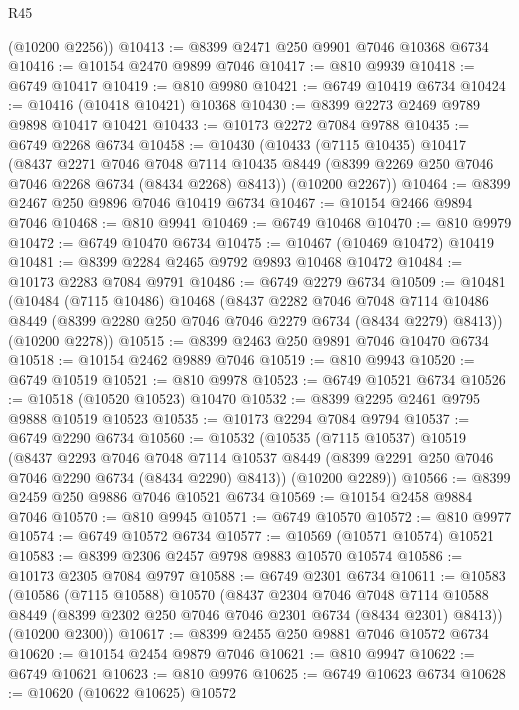 \begin{lexlean}{R45}
\begin{coremodule}
{      (@10200 @2256))
@10413 := @8399 @2471 @250 @9901 @7046 @10368 @6734
@10416 := @10154 @2470 @9899 @7046
@10417 := @810 @9939
@10418 := @6749 @10417
@10419 := @810 @9980
@10421 := @6749 @10419 @6734
@10424 := @10416 (@10418 @10421) @10368
@10430 := @8399 @2273 @2469 @9789 @9898 @10417 @10421
@10433 := @10173 @2272 @7084 @9788
@10435 := @6749 @2268 @6734
@10458 := @10430
    (@10433
      (@7115 @10435)
      @10417
      (@8437
        @2271
        @7046
        @7048
        @7114
        @10435
        @8449
        (@8399 @2269 @250 @7046 @7046 @2268 @6734 (@8434 @2268) @8413))
      (@10200 @2267))
@10464 := @8399 @2467 @250 @9896 @7046 @10419 @6734
@10467 := @10154 @2466 @9894 @7046
@10468 := @810 @9941
@10469 := @6749 @10468
@10470 := @810 @9979
@10472 := @6749 @10470 @6734
@10475 := @10467 (@10469 @10472) @10419
@10481 := @8399 @2284 @2465 @9792 @9893 @10468 @10472
@10484 := @10173 @2283 @7084 @9791
@10486 := @6749 @2279 @6734
@10509 := @10481
    (@10484
      (@7115 @10486)
      @10468
      (@8437
        @2282
        @7046
        @7048
        @7114
        @10486
        @8449
        (@8399 @2280 @250 @7046 @7046 @2279 @6734 (@8434 @2279) @8413))
      (@10200 @2278))
@10515 := @8399 @2463 @250 @9891 @7046 @10470 @6734
@10518 := @10154 @2462 @9889 @7046
@10519 := @810 @9943
@10520 := @6749 @10519
@10521 := @810 @9978
@10523 := @6749 @10521 @6734
@10526 := @10518 (@10520 @10523) @10470
@10532 := @8399 @2295 @2461 @9795 @9888 @10519 @10523
@10535 := @10173 @2294 @7084 @9794
@10537 := @6749 @2290 @6734
@10560 := @10532
    (@10535
      (@7115 @10537)
      @10519
      (@8437
        @2293
        @7046
        @7048
        @7114
        @10537
        @8449
        (@8399 @2291 @250 @7046 @7046 @2290 @6734 (@8434 @2290) @8413))
      (@10200 @2289))
@10566 := @8399 @2459 @250 @9886 @7046 @10521 @6734
@10569 := @10154 @2458 @9884 @7046
@10570 := @810 @9945
@10571 := @6749 @10570
@10572 := @810 @9977
@10574 := @6749 @10572 @6734
@10577 := @10569 (@10571 @10574) @10521
@10583 := @8399 @2306 @2457 @9798 @9883 @10570 @10574
@10586 := @10173 @2305 @7084 @9797
@10588 := @6749 @2301 @6734
@10611 := @10583
    (@10586
      (@7115 @10588)
      @10570
      (@8437
        @2304
        @7046
        @7048
        @7114
        @10588
        @8449
        (@8399 @2302 @250 @7046 @7046 @2301 @6734 (@8434 @2301) @8413))
      (@10200 @2300))
@10617 := @8399 @2455 @250 @9881 @7046 @10572 @6734
@10620 := @10154 @2454 @9879 @7046
@10621 := @810 @9947
@10622 := @6749 @10621
@10623 := @810 @9976
@10625 := @6749 @10623 @6734
@10628 := @10620 (@10622 @10625) @10572
}
\end{coremodule}
\end{lexlean}

